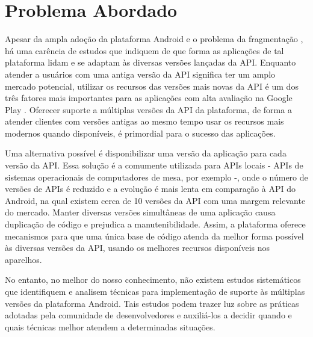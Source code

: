 \section{Problema Abordado} \label{sec:apresentacao-do-problema}

Apesar da ampla adoção da plataforma Android e o problema da fragmentação \cite{Park2013},
há uma carência de estudos que indiquem de que forma as aplicações de tal plataforma
lidam e se adaptam às diversas versões lançadas da API. 
Enquanto atender a usuários com uma antiga versão da API significa ter um amplo
mercado potencial, utilizar os recursos das versões mais novas da API é um dos três 
fatores mais importantes para as aplicações com alta avaliação na Google Play \cite{Tian2015}.
Oferecer suporte a múltiplas versões da API da plataforma, de forma a atender clientes
com versões antigas ao mesmo tempo usar os recursos mais modernos quando disponíveis,
é primordial para o sucesso das aplicações.

Uma alternativa possível é disponibilizar uma versão da aplicação para cada versão
da API. Essa solução é a comumente utilizada para APIs locais - APIs de sistemas
operacionais de computadores de mesa, por exemplo -, onde o número de versões de
APIs é reduzido e a evolução é mais lenta em comparação à API do Android, na qual
existem
cerca de 10 versões da API com uma margem relevante do mercado. Manter diversas
versões simultâneas de uma aplicação causa duplicação de código e prejudica a
manutenibilidade. %
Assim, a plataforma oferece mecanismos para que uma única base
de código atenda da melhor forma possível às diversas versões da API, usando os
melhores recursos disponíveis nos aparelhos.

No entanto, no melhor do nosso conhecimento, não existem estudos sistemáticos que
identifiquem e analisem técnicas para implementação de suporte às
múltiplas versões da plataforma Android. Tais estudos podem trazer luz sobre as
práticas adotadas pela comunidade de desenvolvedores e auxiliá-los a decidir
quando e quais técnicas melhor atendem a determinadas situações.

